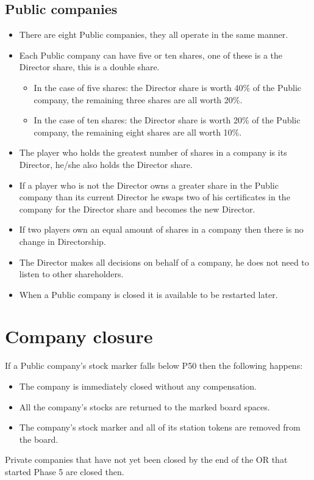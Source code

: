\documentclass[a4paper]{article}
\begin{document}
\subsection{Public companies}
\begin{itemize}
	\item There are eight Public companies, they all operate in the same manner.
	\item Each Public company can have five or ten shares, one of these is a
	the Director share, this is a double share.
	\begin{itemize}
		\item In the case of five shares: the Director share is worth 40\% of
		the Public company, the remaining three shares are all worth 20\%.
		\item In the case of ten shares: the Director share is worth 20\% of
		the Public company, the remaining eight shares are all worth 10\%.
	\end{itemize}
	\item The player who holds the greatest number of shares in a company is its
	Director, he/she also holds the Director share.
	\item If a player who is not the Director owns a greater share in the Public
	company than its current Director he swaps two of his certificates in the
	company for the Director share and becomes the new Director.
	\item If two players own an equal amount of shares in a company then there
	is no change in Directorship.
	\item The Director makes all decisions on behalf of a company, he does not
	need to listen to other shareholders.
	\item When a Public company is closed it is available to be restarted later.
\end{itemize}

\section{Company closure}
If a Public company's stock marker falls below P50 then the following happens:
\begin{itemize}
	\item The company is immediately closed without any compensation.
	\item All the company's stocks are returned to the marked board spaces.
	\item The company's stock marker and all of its station tokens are removed
	from the board.
\end{itemize}

Private companies that have not yet been closed by the end of the OR that
started Phase 5 are closed then.
\end{document}
